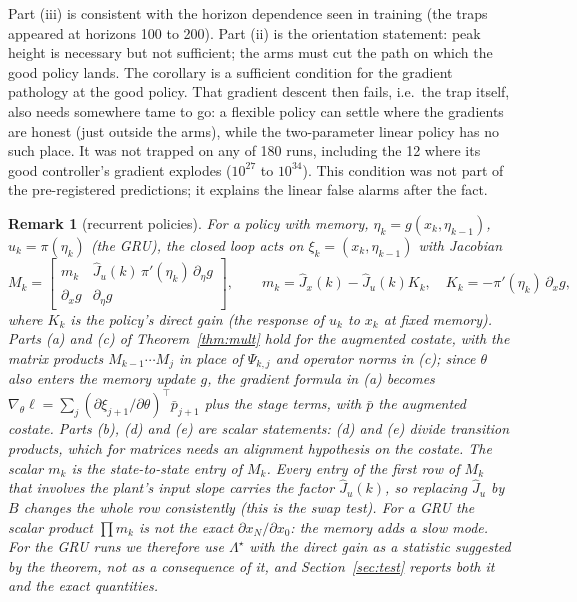 \documentclass[11pt]{article}
\theoremstyle{plainnote}
\newtheorem{remark}{Remark}
\newcommand{\Jx}{\hat J_x}
\newcommand{\Ju}{\hat J_u}
\begin{document}
Part (iii) is consistent with the horizon dependence seen in training (the traps appeared at horizons 100 to 200). Part (ii) is the orientation statement: peak height is necessary but not sufficient; the arms must cut the path on which the good policy lands. The corollary is a sufficient condition for the gradient pathology at the good policy. That gradient descent then fails, i.e.\ the trap itself, also needs somewhere tame to go: a flexible policy can settle where the gradients are honest (just outside the arms), while the two-parameter linear policy has no such place. It was not trapped on any of 180 runs, including the 12 where its good controller's gradient explodes ($10^{27}$ to $10^{34}$). This condition was not part of the pre-registered predictions; it explains the linear false alarms after the fact.

\begin{remark}[recurrent policies]\label{rem:rnn}
For a policy with memory, $\eta_k=g(x_k,\eta_{k-1})$, $u_k=\pi(\eta_k)$ (the GRU), the closed loop acts on $\xi_k=(x_k,\eta_{k-1})$ with Jacobian
\[
M_k=\begin{bmatrix} m_k & \Ju(k)\,\pi'(\eta_k)\,\partial_\eta g\\ \partial_x g & \partial_\eta g\end{bmatrix},\qquad m_k=\Jx(k)-\Ju(k)K_k,\quad K_k=-\pi'(\eta_k)\,\partial_xg,
\]
where $K_k$ is the policy's direct gain (the response of $u_k$ to $x_k$ at fixed memory). Parts (a) and (c) of Theorem~\ref{thm:mult} hold for the augmented costate, with the matrix products $M_{k-1}\cdots M_j$ in place of $\Psi_{k,j}$ and operator norms in (c); since $\theta$ also enters the memory update $g$, the gradient formula in (a) becomes $\nabla_\theta\ell=\sum_j(\partial\xi_{j+1}/\partial\theta)^\top\bar p_{j+1}$ plus the stage terms, with $\bar p$ the augmented costate. Parts (b), (d) and (e) are scalar statements: (d) and (e) divide transition products, which for matrices needs an alignment hypothesis on the costate. The scalar $m_k$ is the state-to-state entry of $M_k$. Every entry of the first row of $M_k$ that involves the plant's input slope carries the factor $\Ju(k)$, so replacing $\Ju$ by $B$ changes the whole row consistently (this is the swap test). For a GRU the scalar product $\prod m_k$ is not the exact $\partial x_N/\partial x_0$: the memory adds a slow mode. For the GRU runs we therefore use $\Lambda^\star$ with the direct gain as a statistic suggested by the theorem, not as a consequence of it, and Section~\ref{sec:test} reports both it and the exact quantities.
\end{remark}
\end{document}

